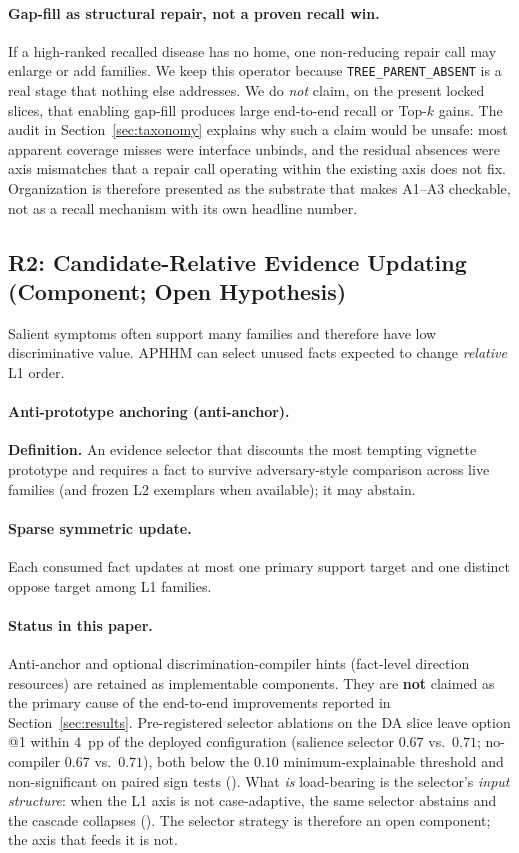 \paragraph{Gap-fill as structural repair, not a proven recall win.}
If a high-ranked recalled disease has no home, one non-reducing repair call may enlarge or add families.
We keep this operator because \texttt{TREE\_PARENT\_ABSENT} is a real stage that nothing else addresses.
We do \emph{not} claim, on the present locked slices, that enabling gap-fill produces large end-to-end recall or Top-$k$ gains.
The audit in Section~\ref{sec:taxonomy} explains why such a claim would be unsafe: most apparent coverage misses were interface unbinds, and the residual absences were axis mismatches that a repair call operating within the existing axis does not fix.
Organization is therefore presented as the substrate that makes A1--A3 checkable, not as a recall mechanism with its own headline number.

\subsection{R2: Candidate-Relative Evidence Updating (Component; Open Hypothesis)}
\label{sec:m2}

Salient symptoms often support many families and therefore have low discriminative value.
APHHM can select unused facts expected to change \emph{relative} L1 order.

\paragraph{Anti-prototype anchoring (anti-anchor).}
\textbf{Definition.}
An evidence selector that discounts the most tempting vignette prototype and requires a fact to survive adversary-style comparison across live families (and frozen L2 exemplars when available); it may abstain.

\paragraph{Sparse symmetric update.}
Each consumed fact updates at most one primary support target and one distinct oppose target among L1 families.

\paragraph{Status in this paper.}
Anti-anchor and optional discrimination-compiler hints (fact-level direction resources) are retained as implementable components.
They are \textbf{not} claimed as the primary cause of the end-to-end improvements reported in Section~\ref{sec:results}.
Pre-registered selector ablations on the DA slice leave option @1 within $4$~pp of the deployed configuration (salience selector $0.67$ vs.\ $0.71$; no-compiler $0.67$ vs.\ $0.71$), both below the $0.10$ minimum-explainable threshold and non-significant on paired sign tests ().
What \emph{is} load-bearing is the selector's \emph{input structure}: when the L1 axis is not case-adaptive, the same selector abstains and the cascade collapses ().
The selector strategy is therefore an open component; the axis that feeds it is not.

